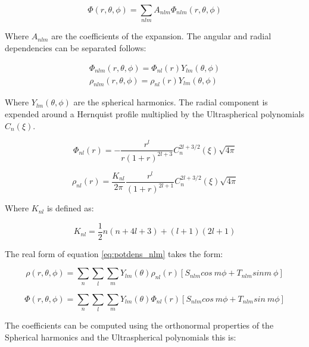 \documentclass[14pt]{article}
\begin{document}
\begin{equation}
    \Phi(r, \theta, \phi) = \sum_{nlm} A_{nlm}\Phi_{nlm}(r, \theta, \phi)
\end{equation}

Where $A_{nlm}$ are the coefficients of the expansion. The angular and radial
dependencies can be separated follows:


\begin{equation}\label{eq:potdens_nlm}
  \begin{aligned}
  \Phi_{nlm}(r, \theta, \phi) = \Phi_{nl}(r)Y_{lm}(\theta, \phi)\\ 
  \rho_{nlm}(r, \theta, \phi) = \rho_{nl}(r)Y_{lm}(\theta, \phi) 
  \end{aligned}
\end{equation}


Where $Y_{lm}(\theta,\phi)$ are the spherical harmonics. The radial component
is expended around a Hernquist profile multiplied by the Ultraspherical
polynomials $C_{n}(\xi)$.


\begin{equation}
  \Phi_{nl}(r) = - \dfrac{r^l}{r(1+r)^{2l+3}}C_{n}^{2l+3/2}(\xi)\sqrt{4\pi}
\end{equation}

\begin{equation}
  \rho_{nl}(r) = \dfrac{K_{nl}}{2\pi}\dfrac{r^l}{(1+r)^{2l+1}}C_{n}^{2l+3/2}(\xi)\sqrt{4\pi}
\end{equation}


Where $K_{nl}$ is defined as:

\begin{equation}
    K_{nl}=\dfrac{1}{2}n(n+4l+3) +(l+1)(2l+1)
\end{equation}

The real form of equation \ref{eq:potdens_nlm} takes the form: 

\begin{equation}
  \rho(r, \theta, \phi) = \sum_{n} \sum_l \sum_m Y_{lm}(\theta) \rho_{nl}(r)
  \left[ S_{nlm} cos\ m \phi + T_{nlm} sin m\ \phi \right]
\end{equation}


\begin{equation}
  \Phi(r, \theta, \phi) = \sum_{n} \sum_l \sum_m Y_{lm}(\theta) \Phi_{nl}(r)
  \left[ S_{nlm} cos\ m\phi + T_{nlm} sin\ m \phi \right]
\end{equation}


The coefficients can be computed using the orthonormal properties of the
Spherical harmonics and the Ultraspherical polynomials this is:
\end{document}
